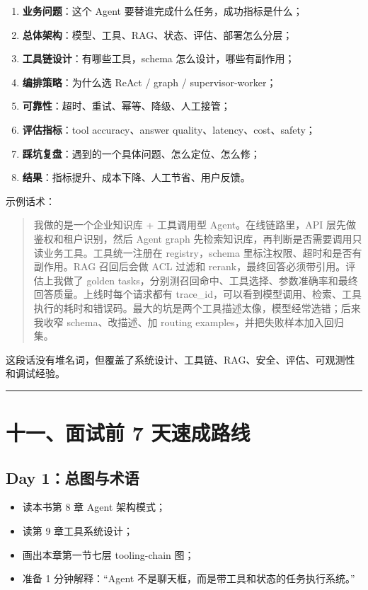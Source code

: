 \begin{enumerate}[leftmargin=2em]
\item \textbf{业务问题}：这个 Agent 要替谁完成什么任务，成功指标是什么；
\item \textbf{总体架构}：模型、工具、RAG、状态、评估、部署怎么分层；
\item \textbf{工具链设计}：有哪些工具，schema 怎么设计，哪些有副作用；
\item \textbf{编排策略}：为什么选 ReAct / graph / supervisor-worker；
\item \textbf{可靠性}：超时、重试、幂等、降级、人工接管；
\item \textbf{评估指标}：tool accuracy、answer quality、latency、cost、safety；
\item \textbf{踩坑复盘}：遇到的一个具体问题、怎么定位、怎么修；
\item \textbf{结果}：指标提升、成本下降、人工节省、用户反馈。
\end{enumerate}

示例话术：


\begin{quote}
我做的是一个企业知识库 + 工具调用型 Agent。在线链路里，API 层先做鉴权和租户识别，然后 Agent graph 先检索知识库，再判断是否需要调用只读业务工具。工具统一注册在 registry，schema 里标注权限、超时和是否有副作用。RAG 召回后会做 ACL 过滤和 rerank，最终回答必须带引用。评估上我做了 golden tasks，分别测召回命中、工具选择、参数准确率和最终回答质量。上线时每个请求都有 trace\_id，可以看到模型调用、检索、工具执行的耗时和错误码。最大的坑是两个工具描述太像，模型经常选错；后来我收窄 schema、改描述、加 routing examples，并把失败样本加入回归集。\\
\end{quote}

这段话没有堆名词，但覆盖了系统设计、工具链、RAG、安全、评估、可观测性和调试经验。


\bigskip\hrule\bigskip

\section{十一、面试前 7 天速成路线}

\subsection{Day 1：总图与术语}

\begin{itemize}[leftmargin=2em]
\item 读本书第 8 章 Agent 架构模式；
\item 读第 9 章工具系统设计；
\item 画出本章第一节七层 tooling-chain 图；
\item 准备 1 分钟解释：``Agent 不是聊天框，而是带工具和状态的任务执行系统。''
\end{itemize}


